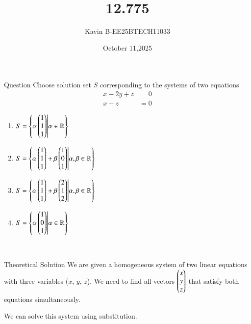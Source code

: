 \documentclass{beamer}
\begin{document}
\title 
{12.775}
\date{October 11,2025}


\author 
{Kavin B-EE25BTECH11033}






\frame{\titlepage}
\begin{frame}{Question}
Choose solution set $S$ corresponding to the systems of two equations
    \begin{align*}
    x - 2y + z &= 0 \\
    x - z &= 0
    \end{align*}
    \begin{enumerate}
        \item $S = \left\{ \alpha \begin{pmatrix} 1 \\ 1 \\ 1 \end{pmatrix} \middle| \alpha \in \mathbb{R} \right\}$
        \item $S = \left\{ \alpha \begin{pmatrix} 1 \\ 1 \\ 1 \end{pmatrix} + \beta \begin{pmatrix} 1 \\ 0 \\ 1 \end{pmatrix} \middle| \alpha, \beta \in \mathbb{R} \right\}$
        \item $S = \left\{ \alpha \begin{pmatrix} 1 \\ 1 \\ 1 \end{pmatrix} + \beta \begin{pmatrix} 2 \\ 1 \\ 2 \end{pmatrix} \middle| \alpha, \beta \in \mathbb{R} \right\}$
        \item $S = \left\{ \alpha \begin{pmatrix} 1 \\ 0 \\ 1 \end{pmatrix} \middle| \alpha \in \mathbb{R} \right\}$
    \end{enumerate}\\    
\bigskip

\end{frame}



\begin{frame}{Theoretical Solution}
We are given a homogeneous system of two linear equations with three variables ($x$, $y$, $z$). We need to find all vectors $\begin{myvec}{ x \\ y \\ z }\end{myvec}$ that satisfy both equations simultaneously.

We can solve this system using substitution.
\end{frame}
\end{document}
